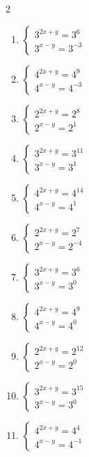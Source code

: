 \documentclass[12pt,a4paper]{article}
\begin{document}
\begin{multicols}{2}
\begin{enumerate}[leftmargin=*, itemsep=6pt]
\item \(\begin{cases} 3^{2x+y}=3^{6}\\ 3^{x-y}=3^{-3}\end{cases}\)

\item \(\begin{cases} 4^{2x+y}=4^{9}\\ 4^{x-y}=4^{-3}\end{cases}\)

\item \(\begin{cases} 2^{2x+y}=2^{8}\\ 2^{x-y}=2^{1}\end{cases}\)

\item \(\begin{cases} 3^{2x+y}=3^{11}\\ 3^{x-y}=3^{1}\end{cases}\)

\item \(\begin{cases} 4^{2x+y}=4^{14}\\ 4^{x-y}=4^{1}\end{cases}\)

\item \(\begin{cases} 2^{2x+y}=2^{7}\\ 2^{x-y}=2^{-4}\end{cases}\)

\item \(\begin{cases} 3^{2x+y}=3^{6}\\ 3^{x-y}=3^{0}\end{cases}\)

\item \(\begin{cases} 4^{2x+y}=4^{9}\\ 4^{x-y}=4^{0}\end{cases}\)

\item \(\begin{cases} 2^{2x+y}=2^{12}\\ 2^{x-y}=2^{0}\end{cases}\)

\item \(\begin{cases} 3^{2x+y}=3^{15}\\ 3^{x-y}=3^{0}\end{cases}\)

\item \(\begin{cases} 4^{2x+y}=4^{4}\\ 4^{x-y}=4^{-1}\end{cases}\)

\end{enumerate}
\end{multicols}
\newpage
\end{document}
